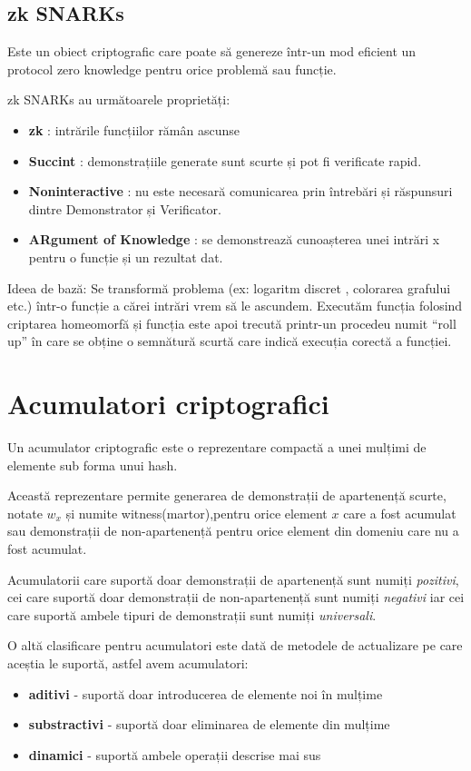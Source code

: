 \documentclass[12pt, letterpaper]{article}
\begin{document}
\subsection{zk SNARKs}
Este un obiect criptografic care poate să genereze într-un mod eficient un protocol zero knowledge pentru orice problemă sau funcție. 

zk SNARKs au următoarele proprietăți:
\begin{itemize}
\item {\textbf{zk} : intrările funcțiilor rămân ascunse} 
\item{\textbf{Succint} : demonstrațiile generate sunt scurte și pot fi verificate rapid.}
\item{\textbf{Noninteractive} : nu este necesară comunicarea prin întrebări și răspunsuri dintre Demonstrator și Verificator.}
\item{\textbf{ARgument of Knowledge} : se demonstrează cunoașterea unei intrări x pentru o funcție și un rezultat dat.}
\end{itemize}
Ideea de bază:
Se transformă problema (ex: logaritm discret , colorarea grafului etc.) într-o funcție a cărei intrări vrem să le ascundem.
Executăm funcția folosind criptarea homeomorfă și funcția este apoi trecută printr-un procedeu numit “roll up” în care se obține o semnătură scurtă care indică execuția corectă a funcției.

\pagebreak
\section{Acumulatori criptografici}
Un acumulator criptografic este o reprezentare compactă a unei mulțimi de elemente sub forma unui hash. 

Această reprezentare permite generarea de demonstrații de apartenență scurte, notate $w_x$ și numite witness(martor),pentru orice element $x$ care a fost acumulat sau demonstrații de non-apartenență pentru orice element din domeniu care nu a fost acumulat.

Acumulatorii care suportă doar demonstrații de apartenență sunt numiți \emph{pozitivi}, cei care suportă doar demonstrații de non-apartenență sunt numiți \emph{negativi} iar cei care suportă ambele tipuri de demonstrații sunt numiți \emph{universali}.

O altă clasificare pentru acumulatori este dată de metodele de actualizare pe care aceștia le suportă, astfel avem acumulatori:
\begin{itemize}
    \item{\textbf{aditivi} - suportă doar introducerea de elemente noi în mulțime}
    \item{\textbf{substractivi} - suportă doar eliminarea de elemente din mulțime}
    \item{\textbf{dinamici} - suportă ambele operații descrise mai sus}
\end{itemize}
\end{document}
